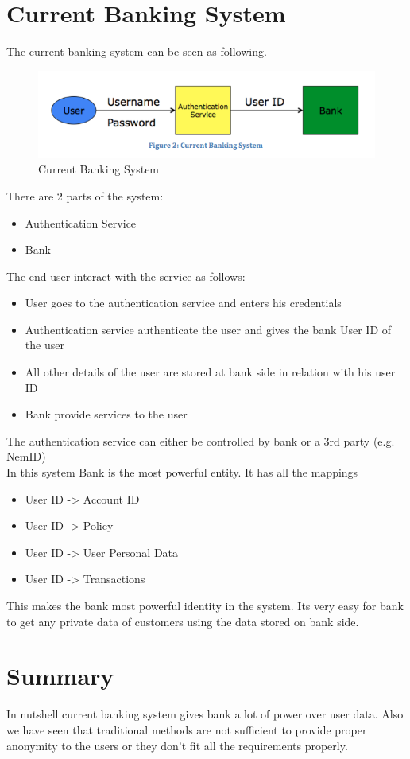 \section{Current Banking System}
The current banking system can be seen as following.
\begin{figure}[h]
	\centering
	\includegraphics[width=\textwidth]{figures/Current}
	\caption{Current Banking System}
	\label{fig:Current}
\end{figure}
There are 2 parts of the system:
\begin{itemize}
	\item Authentication Service 
	\item Bank
\end{itemize}
The end user interact with the service as follows:
\begin{itemize}
\item User goes to the authentication service and enters his credentials
\item Authentication service authenticate the user and gives the bank User ID of the user
\item All other details of the user are stored at bank side in relation with his user ID
\item Bank provide services to the user 
\end{itemize}
The authentication service can either be controlled by bank or a 3rd party (e.g. NemID)
\\In this system Bank is the most powerful entity. It has all the mappings
\begin{itemize}
	\item User ID -> Account ID
	\item User ID -> Policy
	\item User ID -> User Personal Data
	\item User ID -> Transactions
\end{itemize}
This makes the bank most powerful identity in the system. Its very easy for bank to get any private data of customers using the data stored on bank side.
\section{Summary}
In nutshell current banking system gives bank a lot of power over user data. Also we have seen that traditional methods are not sufficient to provide proper anonymity to the users or they don't fit all the requirements properly.